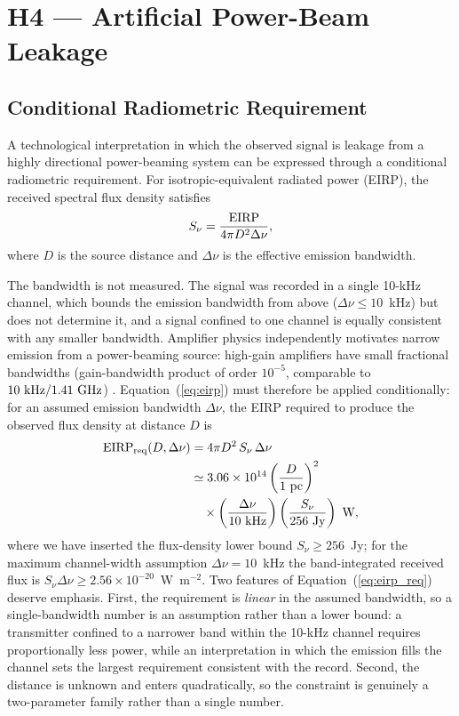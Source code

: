 \documentclass[twocolumn]{aastex701}
\newcommand{\snu}{S_\nu}
\begin{document}

\section{H4 --- Artificial Power-Beam Leakage}
\label{sec:h4}

\subsection{Conditional Radiometric Requirement}

A technological interpretation in which the observed signal is leakage from a highly directional power-beaming system can be expressed through a conditional radiometric requirement. For isotropic-equivalent radiated power (EIRP), the received spectral flux density satisfies
\begin{equation}
\snu=
\frac{{\rm EIRP}}
{4\pi D^2\Delta\nu},
\label{eq:eirp}
\end{equation}
where $D$ is the source distance and $\Delta\nu$ is the effective emission bandwidth.

The bandwidth is not measured. The signal was recorded in a single 10-kHz channel, which bounds the emission bandwidth from above ($\Delta\nu\leq10$~kHz) but does not determine it, and a signal confined to one channel is equally consistent with any smaller bandwidth. Amplifier physics independently motivates narrow emission from a power-beaming source: high-gain amplifiers have small fractional bandwidths (gain-bandwidth product of order $10^{-5}$, comparable to $10~{\rm kHz}/1.41~{\rm GHz}$) \citep{benford2025}. Equation~(\ref{eq:eirp}) must therefore be applied conditionally: for an assumed emission bandwidth $\Delta\nu$, the EIRP required to produce the observed flux density at distance $D$ is
\begin{equation}
\begin{split}
{\rm EIRP}_{\rm req}(D,\Delta\nu)
&=
4\pi D^2\,\snu\,\Delta\nu \\
&\simeq
3.06\times10^{14}
\left(\frac{D}{1~{\rm pc}}\right)^2 \\
&\quad\times
\left(\frac{\Delta\nu}{10~{\rm kHz}}\right)
\left(\frac{\snu}{256~{\rm Jy}}\right)
~{\rm W},
\end{split}
\label{eq:eirp_req}
\end{equation}
where we have inserted the flux-density lower bound $\snu\geq256$~Jy; for the maximum channel-width assumption $\Delta\nu=10$~kHz the band-integrated received flux is $\snu\Delta\nu\geq2.56\times10^{-20}$~W~m$^{-2}$. Two features of Equation~(\ref{eq:eirp_req}) deserve emphasis. First, the requirement is {\em linear} in the assumed bandwidth, so a single-bandwidth number is an assumption rather than a lower bound: a transmitter confined to a narrower band within the 10-kHz channel requires proportionally less power, while an interpretation in which the emission fills the channel sets the largest requirement consistent with the record. Second, the distance is unknown and enters quadratically, so the constraint is genuinely a two-parameter family rather than a single number.
\end{document}
